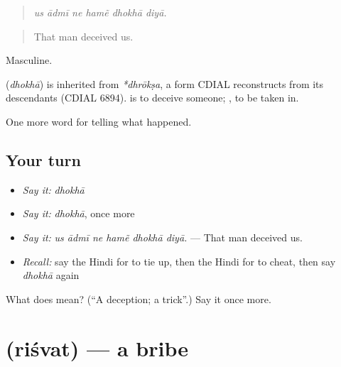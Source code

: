\begin{quote}
     
\end{quote}

\begin{quote}
\emph{us ādmī ne hamẽ dhokhā diyā.}
\end{quote}

\begin{quote}
That man deceived us.
\end{quote}

Masculine.

\begin{cousinweb}
\textbf{} (\emph{dhokhā}) is inherited from \emph{*dhrōkṣa}, a form CDIAL reconstructs from its descendants (CDIAL 6894). \textbf{ } is to deceive someone; \textbf{ }, to be taken in.
\end{cousinweb}

\begin{grammarlens}[title={What you've built}]
One more word for telling what happened.
\end{grammarlens}

\subsection*{Your turn}
\begin{itemize}
\raggedright
  \item \emph{Say it:} \emph{dhokhā}
  \item \emph{Say it:} \emph{dhokhā}, once more
  \item \emph{Say it:} \emph{us ādmī ne hamẽ dhokhā diyā.} — That man deceived us.
  \item \emph{Recall:} say the Hindi for to tie up, then the Hindi for to cheat, then say \emph{dhokhā} again
\end{itemize}

\begin{tcolorbox}[breakable,colback=teal!4,colframe=teal!35!black,title={Before you move on}]
What does  mean? (\textquotedblleft{}A deception; a trick\textquotedblright{}.) Say it once more.
\end{tcolorbox}
\section[\texorpdfstring{\hi{रिश्वत} (riśvat)}{रिश्वत (riśvat)}]{ (riśvat) — a bribe}

